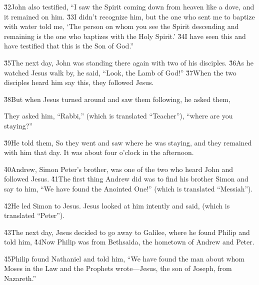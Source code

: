\v{32}John also testified, ``I saw the Spirit coming down from heaven like a dove, and it remained on him. \v{33}I didn't recognize him, but the one who sent me to baptize with water told me, `The person on whom you see the Spirit descending and remaining is the one who baptizes with the Holy Spirit.' \v{34}I have seen this and have testified that this is the Son of God.''

\v{35}The next day, John was standing there again with two of his disciples. \v{36}As he watched Jesus walk by, he said, ``Look, the Lamb of God!'' \v{37}When the two disciples heard him say this, they followed Jesus.

\v{38}But when Jesus turned around and saw them following, he asked them, 

They asked him, ``Rabbi,'' (which is translated ``Teacher''), ``where are you staying?''

\v{39}He told them,  So they went and saw where he was staying, and they remained with him that day. It was about four o'clock in the afternoon.

\v{40}Andrew, Simon Peter's brother, was one of the two who heard John and followed Jesus. \v{41}The first thing Andrew did was to find his brother Simon and say to him, ``We have found the Anointed One!'' (which is translated ``Messiah'').

\v{42}He led Simon to Jesus. Jesus looked at him intently and said,  (which is translated ``Peter'').

\v{43}The next day, Jesus decided to go away to Galilee, where he found Philip and told him,  \v{44}Now Philip was from Bethsaida, the hometown of Andrew and Peter.

\v{45}Philip found Nathaniel and told him, ``We have found the man about whom Moses in the Law and the Prophets wrote---Jesus, the son of Joseph, from Nazareth.''

